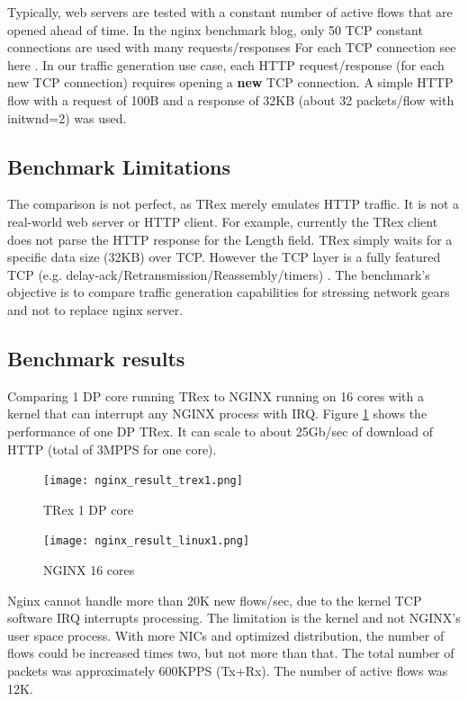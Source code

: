 \documentclass[conference]{IEEEtran}
\begin{document}
Typically, web servers are tested with a constant number of active flows that are opened ahead of time. 
In the nginx benchmark blog, only 50 TCP constant connections are used with many requests/responses 
For each TCP connection see here \cite{b6}. In our traffic generation use case, each HTTP request/response (for each new TCP connection) requires opening a \textbf{new} TCP connection. 
A simple HTTP flow with a request of 100B and a response of 32KB (about 32 packets/flow with initwnd=2) was used.

\subsection{Benchmark Limitations}

The comparison is not perfect, as TRex merely emulates HTTP traffic. 
It is not a real-world web server or HTTP client. For example, currently the TRex client does not parse the HTTP response for the Length field. 
TRex simply waits for a specific data size (32KB) over TCP. However the TCP layer is a fully featured TCP (e.g. delay-ack/Retransmission/Reassembly/timers) . 
The benchmark's objective is to compare traffic generation capabilities for stressing network gears and not to replace nginx server. 

\subsection{Benchmark results}

Comparing 1 DP core running TRex to NGINX running on 16 cores with a kernel that can interrupt any NGINX process with IRQ. Figure \ref{fig:trex_nginx_r1} shows the performance of one DP TRex. 
It can scale to about 25Gb/sec of download of HTTP (total of 3MPPS for one core).

\begin{figure}[h]
  \texttt{[image: nginx\_result\_trex1.png]}
  \caption{TRex 1 DP core}
  \label{fig:trex_nginx_r1}
\end{figure}

\begin{figure}[h]
  \texttt{[image: nginx\_result\_linux1.png]}
  \caption{NGINX 16 cores}
  \label{fig:trex_nginx_r2}
\end{figure}

Nginx cannot handle more than 20K new flows/sec, due to the kernel TCP software IRQ interrupts processing. 
The limitation is the kernel and not NGINX's user space process.
With more NICs and optimized distribution, the number of flows could be increased times two, but not more than that. 
The total number of packets was approximately 600KPPS (Tx+Rx). The number of active flows was 12K.
\end{document}
